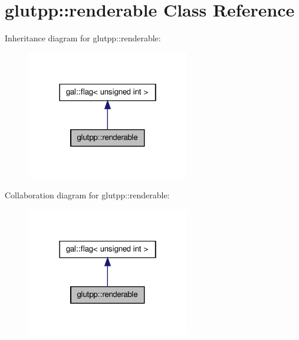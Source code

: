 \hypertarget{classglutpp_1_1renderable}{\section{glutpp\-:\-:renderable \-Class \-Reference}
\label{classglutpp_1_1renderable}
}


\-Inheritance diagram for glutpp\-:\-:renderable\-:\nopagebreak
\begin{figure}[H]
\begin{center}
\leavevmode
\includegraphics[width=202pt]{classglutpp_1_1renderable__inherit__graph}
\end{center}
\end{figure}


\-Collaboration diagram for glutpp\-:\-:renderable\-:\nopagebreak
\begin{figure}[H]
\begin{center}
\leavevmode
\includegraphics[width=202pt]{classglutpp_1_1renderable__coll__graph}
\end{center}
\end{figure}
